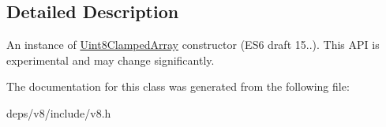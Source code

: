 \subsection{Detailed Description}
An instance of \hyperlink{classv8_1_1_uint8_clamped_array}{Uint8\+Clamped\+Array} constructor (E\+S6 draft 15..). This A\+P\+I is experimental and may change significantly. 

The documentation for this class was generated from the following file\+:\begin{DoxyCompactItemize}
\item 
deps/v8/include/v8.\+h\end{DoxyCompactItemize}

